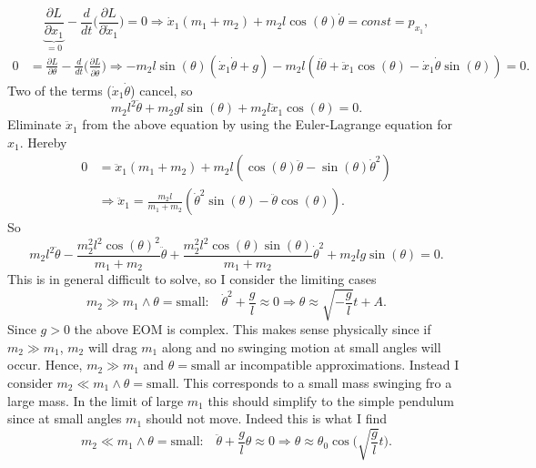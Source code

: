 \begin{example}
	\begin{equation}
		\underbrace{\frac{\partial L}{\partial x_1}}_{=0}-\frac{d}{dt}\bigg(\frac{\partial L}{\partial \dot{x}_1}\bigg)=0\Rightarrow \dot{x}_1(m_1+m_2)+m_2l\cos(\theta)\dot{\theta}=const=p_{x_1},
	\end{equation} 
	\begin{equation}
		\begin{split}
			0&=\frac{\partial L}{\partial \theta}-\frac{d}{dt}\bigg(\frac{\partial L}{\partial \dot{\theta}}\bigg)\Rightarrow -m_2l\sin(\theta)(\dot{x}_1\dot{\theta}+g)-m_2l(l\ddot{\theta}+\ddot{x}_1\cos(\theta)-\dot{x}_1\dot{\theta}\sin(\theta))=0.
		\end{split}
	\end{equation} 
	Two of the terms ($\dot{x}_1\dot{\theta}$) cancel, so
	\begin{equation}
		m_2l^2\ddot{\theta}+m_2gl\sin(\theta)+m_2l\ddot{x}_1\cos(\theta)=0.
	\end{equation} 
	Eliminate $\ddot{x}_1$ from the above equation by using the Euler-Lagrange equation for $x_1$. Hereby
	\begin{equation}
		\begin{split}
			0&=\ddot{x}_1(m_1+m_2)+m_2l(\cos(\theta)\ddot{\theta}-\sin(\theta)\dot{ \theta}^2)\\
			&\Rightarrow \ddot{x}_1=\frac{m_2l}{m_1+m_2}(\dot{\theta}^2\sin(\theta)-\ddot{\theta}\cos(\theta)).
		\end{split}
	\end{equation} 
	So
	\begin{equation}
		m_2l^2\ddot{\theta}-\frac{m_2^2l^2\cos(\theta)^2}{m_1+m_2}\ddot{\theta}+\frac{m_2^2l^2\cos(\theta)\sin(\theta)}{m_1+m_2}\dot{\theta}^2+m_2lg\sin(\theta)=0.
	\end{equation} 
	This is in general difficult to solve, so I consider the  limiting cases
	\begin{equation}
		m_2\gg m_1 \wedge \theta=\text{small:}\quad \dot{\theta}^2+\frac{g}{l}\approx 0 \Rightarrow \theta\approx
		\sqrt{-\frac{g}{l}}t+A.
	\end{equation} 
	Since $g>0$ the above EOM is complex. This makes sense physically since if $m_2\gg m_1$, $m_2$ will drag $m_1$ along and no swinging motion at small angles will occur. Hence, $m_2\gg m_1$ and $\theta=\text{small}$ ar incompatible approximations. Instead I consider $m_2\ll m_1 \wedge \theta=\text{small}$. This corresponds to a small mass swinging fro a large mass. In the limit of large $m_1$ this should simplify to the simple pendulum since at small angles $m_1$ should not move. Indeed this is what I find
	\begin{equation}
		m_2\ll m_1 \wedge \theta=\text{small:}\quad \ddot{\theta}+\frac{g}{l}\theta\approx 0 \Rightarrow \theta\approx \theta_0\cos\bigg(\sqrt{\frac{g}{l}}t\bigg).
	\end{equation} 
\end{example}
